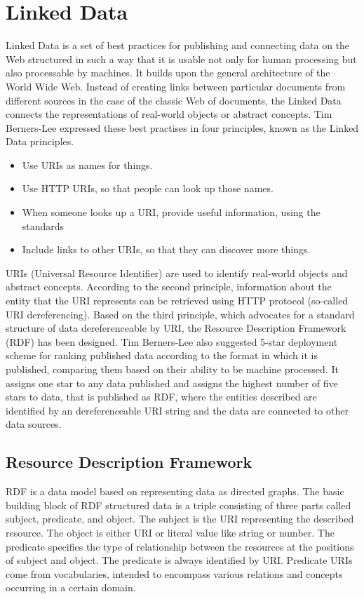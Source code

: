 \chapter{Linked Data}

Linked Data is a set of best practices for publishing and connecting data on the Web structured in such a way that it is usable not only for human processing but also processable by machines. It builds upon the general architecture of the World Wide Web. Instead of creating links between particular documents from different sources in the case of the classic Web of documents, the Linked Data connects the representations of real-world objects or abstract concepts. Tim Berners-Lee expressed these best practises in four principles, known as the Linked Data principles.\cite{bernersLee2006}

\begin{itemize}
    \item Use URIs as names for things.
    \item Use HTTP URIs, so that people can look up those names.
    \item When someone looks up a URI, provide useful information, using the standards
    \item Include links to other URIs, so that they can discover more things.
\end{itemize}

URIs (Universal Resource Identifier) are used to identify real-world objects and abstract concepts. According to the second principle, information about the entity that the URI represents can be retrieved using HTTP protocol (so-called URI dereferencing). Based on the third principle, which advocates for a standard structure of data dereferenceable by URI, the Resource Description Framework (RDF) has been designed. Tim Berners-Lee also suggested 5-star deployment scheme for ranking published data according to the format in which it is published, comparing them based on their ability to be machine processed. It assigns one star to any data published and assigns the highest number of five stars to data, that is published as RDF, where the entities described are identified by an dereferenceable URI string and the data are connected to other data sources.

\section{Resource Description Framework}

RDF is a data model based on representing data as directed graphs. The basic building block of RDF structured data is a triple consisting of three parts called subject, predicate, and object. The subject is the URI representing the described resource. The object is either URI or literal value like string or number. The predicate specifies the type of relationship between the resources at the positions of subject and object. The predicate is always identified by URI. Predicate URIs come from vocabularies, intended to encompass various relations and concepts occurring in a certain domain.

